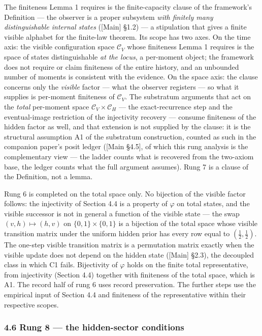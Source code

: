 \documentclass[
]{article}
\begin{document}
The finiteness Lemma 1 requires is the finite-capacity clause of the
framework's Definition --- the observer is a proper subsystem \emph{with
finitely many distinguishable internal states} ({[}Main{]} §1.2) --- a
stipulation that gives a finite visible alphabet for the finite-law
theorem. Its scope has two axes. On the time axis: the visible
configuration space \(\mathcal{C}_V\) whose finiteness Lemma 1 requires
is the space of states distinguishable \emph{at the locus}, a per-moment
object; the framework does not require or claim finiteness of the entire
history, and an unbounded number of moments is consistent with the
evidence. On the space axis: the clause concerns only the \emph{visible}
factor --- what the observer registers --- so what it supplies is
per-moment finiteness of \(\mathcal{C}_V\). The substratum arguments
that act on the \emph{total} per-moment space
\(\mathcal{C}_V \times \mathcal{C}_H\) --- the exact-recurrence step and
the eventual-image restriction of the injectivity recovery --- consume
finiteness of the hidden factor as well, and that extension is not
supplied by the clause: it is the structural assumption A1 of the
substratum construction, counted as such in the companion paper's posit
ledger ({[}Main §4.5{]}, of which this rung analysis is the
complementary view --- the ladder counts what is recovered from the
two-axiom base, the ledger counts what the full argument assumes). Rung
7 is a clause of the Definition, not a lemma.

Rung 6 is completed on the total space only. No bijection of the visible
factor follows: the injectivity of Section 4.4 is a property of
\(\varphi\) on total states, and the visible successor is not in general
a function of the visible state --- the swap \((v, h) \mapsto (h, v)\)
on \(\{0,1\} \times \{0,1\}\) is a bijection of the total space whose
visible transition matrix under the uniform hidden prior has every row
equal to \((\tfrac12, \tfrac12)\). The one-step visible transition
matrix is a permutation matrix exactly when the visible update does not
depend on the hidden state ({[}Main{]} §2.3), the decoupled class in
which C1 fails. Bijectivity of \(\varphi\) holds on the finite total
representative, from injectivity (Section 4.4) together with finiteness
of the total space, which is A1. The record half of rung 6 uses record
preservation. The further steps use the empirical input of Section 4.4
and finiteness of the representative within their respective scopes.

\hypertarget{rung-8-the-hidden-sector-conditions}{%
\subsubsection{4.6 Rung 8 --- the hidden-sector
conditions}\label{rung-8-the-hidden-sector-conditions}}
\end{document}
